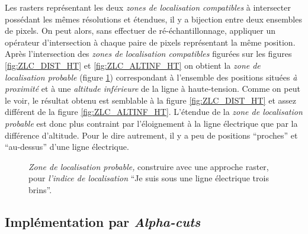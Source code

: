 Les rasters représentant les deux \emph{zones de localisation
  compatibles} à intersecter possédant les mêmes résolutions et
étendues, il y a bijection entre deux ensembles de pixels. On peut
alors, sans effectuer de ré-échantillonnage, appliquer un opérateur
d'intersection à chaque paire de pixels représentant la même
position. Après l'intersection des \emph{zones de localisation
  compatibles} figurées sur les figures \ref{fig:ZLC_DIST_HT} et
\ref{fig:ZLC_ALTINF_HT} on obtient la \emph{zone de localisation
  probable} (figure \ref{fig:ZLP_SOUS_HT}) correspondant à l'ensemble
des positions situées \emph{à proximité} et à une \emph{altitude
  inférieure} de la ligne à haute-tension. Comme on peut le voir, le
résultat obtenu est semblable à la figure \ref{fig:ZLC_DIST_HT} et
assez différent de la figure \ref{fig:ZLC_ALTINF_HT}. L'étendue de la
\emph{zone de localisation probable} est donc plus contraint par
l'éloignement à la ligne électrique que par la différence
d'altitude. Pour le dire autrement, il y a peu de positions
\enquote{proches} et \enquote{au-dessus} d'une ligne électrique.

\begin{figure}
  \centering
  
  \caption{\emph{Zone de localisation probable,} construire avec une
    approche raster, pour \emph{l'indice de localisation} \enquote{Je
      suis sous une ligne électrique trois brins}.}
  \label{fig:ZLP_SOUS_HT}
\end{figure}

\subsection{Implémentation par \emph{Alpha-cuts}}

